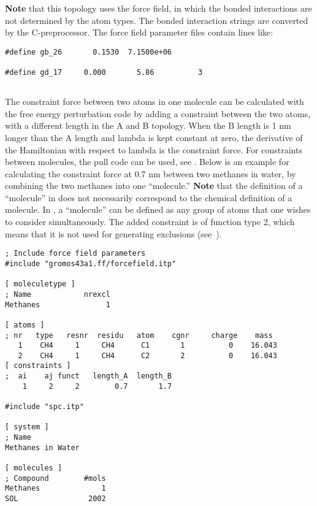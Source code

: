 {\bf Note} that this topology uses the  force field, in which the bonded
interactions are not determined by the atom types. The bonded interaction
strings are converted by the C-preprocessor. The force field parameter
files contain lines like:

{\small
\begin{verbatim}
#define gb_26       0.1530  7.1500e+06

#define gd_17     0.000       5.86          3
\end{verbatim}}

\subsection{}
\label{subsec:constraintforce}
The constraint force between two atoms in one molecule can be calculated
with the free energy perturbation code by adding a constraint between the
two atoms, with a different length in the A and B topology. When the B length
is 1 nm longer than the A length and lambda is kept constant at zero,
the derivative of the Hamiltonian with respect to lambda is the constraint
force. For constraints between molecules, the pull code can be used,
see .
Below is an example for calculating the constraint force at 0.7 nm
between two methanes in water, by combining the two methanes into one ``molecule.''
{\bf Note} that the definition of a ``molecule'' in {\gromacs} does not necessarily
correspond to the chemical definition of a molecule.  In {\gromacs}, a ``molecule''
can be defined as any group of atoms that one wishes to consider simultaneously.
The added constraint is of function type 2, which means that it is not
used for generating exclusions (see~).\\

{\small
\begin{verbatim}
; Include force field parameters
#include "gromos43a1.ff/forcefield.itp"

[ moleculetype ]
; Name            nrexcl
Methanes               1

[ atoms ]
; nr   type   resnr  residu   atom    cgnr     charge    mass
   1    CH4     1     CH4      C1       1          0    16.043
   2    CH4     1     CH4      C2       2          0    16.043
[ constraints ]
;  ai    aj funct   length_A  length_B
    1     2     2        0.7       1.7

#include "spc.itp"

[ system ]
; Name
Methanes in Water

[ molecules ]
; Compound        #mols
Methanes              1
SOL                2002
\end{verbatim}}

